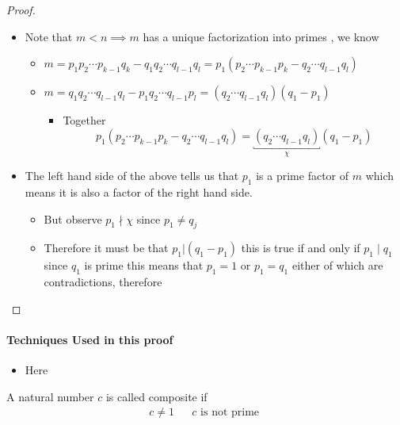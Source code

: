 \documentclass[11pt]{book}
\begin{document}
\begin{proof}
\begin{itemize}
\begin{itemize}
        \end{itemize}
    \item Note that $m < n \implies m$ has a unique factorization into primes , we know
        \begin{itemize}
            \item $m = p_1 p_2 \dotsb p_{k - 1} q_{k}  - q_1 q_2 \dotsb q_{l - 1} q_{l}= p_{1} \left( p_2 \dotsb p_{k - 1} p_{k} - q_2 \dotsb q_{l - 1} q_{l} \right) $ 
            \item $m = q_1 q_2 \dotsb q_{l - 1} q_{l} - p_1 q_2 \dotsb q_{l - 1} p_{l} = \left(  q_2 \dotsb q_{l - 1} q_{l} \right) \left( q_{1}  - p_{1}  \right) $ 
            \begin{itemize}
                \item Together
                    \[
 p_{1} \left( p_2 \dotsb p_{k - 1} p_{k} - q_2 \dotsb q_{l - 1} q_{l} \right) = \underbracket{\left(  q_2 \dotsb q_{l - 1} q_{l} \right)}_{\chi}  \left( q_{1}  - p_{1}  \right) 
                    \]
            \end{itemize}
        \end{itemize}
    \item The left hand side of the above tells us that $p_{1} $ is a prime factor of $m$ which means it is also a factor of the right hand side.
        \begin{itemize}
            \item But observe $p_{1} \nmid \chi$ since $p_{1} \neq q_{j} $ 
            \item Therefore it must be that $p_{1} | \left( q_{1}  - p_{1}  \right) $ this is true if and only if $p_{1} \mid q_{1} $ since $q_{1} $ is prime this means that $p_{1} = 1$ or $p_{1} = q_{1} $ either of which are contradictions, therefore  
        \end{itemize}
\end{itemize}
\end{proof}

\paragraph{Techniques Used in this proof} 
\begin{itemize}
    \item Here
\end{itemize}

\begin{defn}[Composite]\label{defn:composite}
    A natural number $c$ is called composite if
    \begin{align*}
        c \neq 1 && c \text{ is not prime } 
    \end{align*}
\end{defn}
\end{document}
